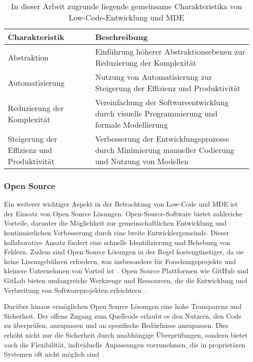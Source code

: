 \begin{table}[h!]
    \centering
    \begin{tabular}{|p{5cm}|p{9cm}|}
    \hline
    \textbf{Charakteristik} & \textbf{Beschreibung} \\
    \hline
    Abstraktion & Einführung höherer Abstraktionsebenen zur Reduzierung der Komplexität \\
    \hline
    Automatisierung & Nutzung von Automatisierung zur Steigerung der Effizienz und Produktivität \\
    \hline
    Reduzierung der Komplexität & Vereinfachung der Softwareentwicklung durch visuelle Programmierung und formale Modellierung \\
    \hline
    Steigerung der Effizienz und Produktivität & Verbesserung der Entwicklungsprozesse durch Minimierung manueller Codierung und Nutzung von Modellen \\
    \hline
    \end{tabular}
    \caption{In dieser Arbeit zugrunde liegende gemeinsame Charakteristika von Low-Code-Entwicklung und MDE}
    \label{tab:common_characteristics}
\end{table}

\subsubsection{Open Source}
Ein weiterer wichtiger Aspekt in der Betrachtung von Low-Code und MDE ist der 
Einsatz von Open Source Lösungen. Open-Source-Software bietet zahlreiche Vorteile, darunter die Möglichkeit 
zur gemeinschaftlichen Entwicklung und kontinuierlichen Verbesserung durch eine breite Entwicklergemeinde. 
Dieser kollaborative Ansatz fördert eine schnelle Identifizierung und Behebung 
von Fehlern. Zudem sind Open Source Lösungen in der Regel kostengünstiger, da sie keine Lizenzgebühren 
erfordern, was insbesondere für Forschungsprojekte und kleinere Unternehmen von Vorteil 
ist~\cite{raymond2010cathedral}. Open Source Plattformen wie GitHub und GitLab bieten umfangreiche Werkzeuge und 
Ressourcen, die die Entwicklung und Verbreitung von Softwareprojekten erleichtern~\cite{fitzgerald2006transformation}.

Darüber hinaus ermöglichen Open Source Lösungen eine hohe Transparenz und Sicherheit. Der offene Zugang 
zum Quellcode erlaubt es den Nutzern, den Code zu überprüfen, anzupassen und an spezifische Bedürfnisse 
anzupassen. Dies erhöht nicht nur die Sicherheit durch unabhängige Überprüfungen, sondern bietet auch 
die Flexibilität, individuelle Anpassungen vorzunehmen, die in proprietären Systemen oft nicht 
möglich sind~\cite{von2006promise}.

